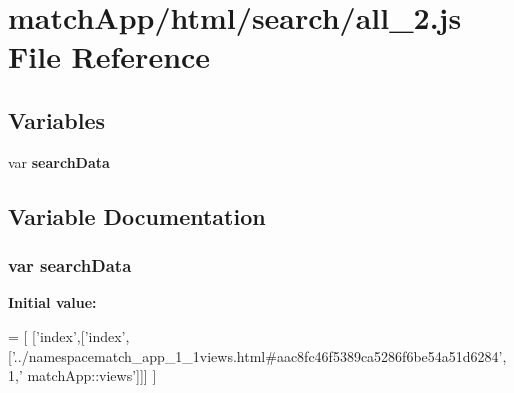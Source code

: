 \section{match\+App/html/search/all\+\_\+2.js File Reference}
\label{all__2_8js}
\subsection*{Variables}
\begin{DoxyCompactItemize}
\item 
var {\bf search\+Data}
\end{DoxyCompactItemize}


\subsection{Variable Documentation}
\subsubsection[{search\+Data}]{\setlength{\rightskip}{0pt plus 5cm}var search\+Data}\label{all__2_8js_ad01a7523f103d6242ef9b0451861231e}
{\bfseries Initial value\+:}
\begin{DoxyCode}
=
[
  [\textcolor{stringliteral}{'index'},[\textcolor{stringliteral}{'index'},[\textcolor{stringliteral}{'../namespacematch\_app\_1\_1views.html#aac8fc46f5389ca5286f6be54a51d6284'},1,\textcolor{stringliteral}{'
      matchApp::views'}]]]
]
\end{DoxyCode}
